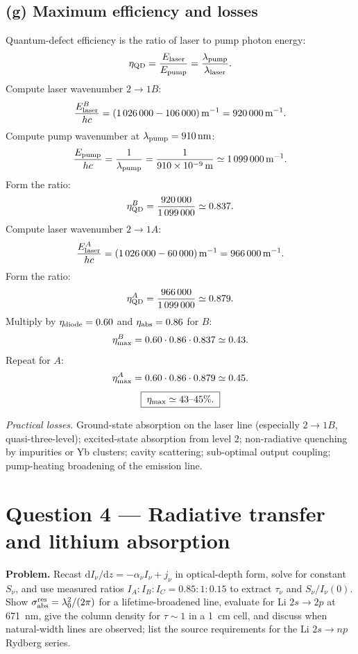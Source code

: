 \documentclass[11pt]{article}
\newcommand{\de}{\mathrm{d}}
\begin{document}
\subsection*{(g) Maximum efficiency and losses}

Quantum-defect efficiency is the ratio of laser to pump photon energy:
\[
\eta_{\rm QD}=\frac{E_{\rm laser}}{E_{\rm pump}}=\frac{\lambda_{\rm pump}}{\lambda_{\rm laser}}.
\]
Compute laser wavenumber $2\to 1B$:
\[
\frac{E_{\rm laser}^{B}}{hc}=(1\,026\,000-106\,000)\,\si{m^{-1}}=920\,000\,\si{m^{-1}}.
\]
Compute pump wavenumber at $\lambda_{\rm pump}=\SI{910}{nm}$:
\[
\frac{E_{\rm pump}}{hc}=\frac{1}{\lambda_{\rm pump}}=\frac{1}{910\times 10^{-9}\,\si{m}}\simeq 1\,099\,000\,\si{m^{-1}}.
\]
Form the ratio:
\[
\eta_{\rm QD}^{B}=\frac{920\,000}{1\,099\,000}\simeq 0.837.
\]
Compute laser wavenumber $2\to 1A$:
\[
\frac{E_{\rm laser}^{A}}{hc}=(1\,026\,000-60\,000)\,\si{m^{-1}}=966\,000\,\si{m^{-1}}.
\]
Form the ratio:
\[
\eta_{\rm QD}^{A}=\frac{966\,000}{1\,099\,000}\simeq 0.879.
\]
Multiply by $\eta_{\rm diode}=0.60$ and $\eta_{\rm abs}=0.86$ for $B$:
\[
\eta_{\rm max}^{B}=0.60\cdot 0.86\cdot 0.837\simeq 0.43.
\]
Repeat for $A$:
\[
\eta_{\rm max}^{A}=0.60\cdot 0.86\cdot 0.879\simeq 0.45.
\]
\begin{equation}
\boxed{\;\eta_{\rm max}\simeq 43\text{--}45\%.\;}
\label{eq:eta-max}
\end{equation}

\textit{Practical losses.} Ground-state absorption on the laser line (especially $2\to 1B$, quasi-three-level); excited-state absorption from level $2$; non-radiative quenching by impurities or Yb clusters; cavity scattering; sub-optimal output coupling; pump-heating broadening of the emission line.

\section*{Question 4 --- Radiative transfer and lithium absorption}

\textbf{Problem.} Recast $\de I_\nu/\de z=-\alpha_\nu I_\nu+j_\nu$ in optical-depth form, solve for constant $S_\nu$, and use measured ratios $I_A:I_B:I_C=0.85:1:0.15$ to extract $\tau_\nu$ and $S_\nu/I_\nu(0)$. Show $\sigma_{\rm abs}^{\rm res}=\lambda_0^2/(2\pi)$ for a lifetime-broadened line, evaluate for Li $2s\to 2p$ at \SI{671}{nm}, give the column density for $\tau\sim 1$ in a \SI{1}{cm} cell, and discuss when natural-width lines are observed; list the source requirements for the Li $2s\to np$ Rydberg series.
\end{document}
